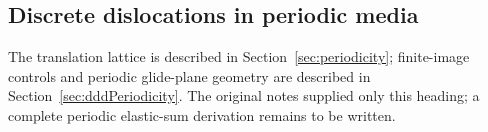 

\subsection{Discrete dislocations in periodic media}
The translation lattice is described in Section~\ref{sec:periodicity}; finite-image controls and periodic glide-plane geometry are described in Section~\ref{sec:dddPeriodicity}. The original notes supplied only this heading; a complete periodic elastic-sum derivation remains to be written.